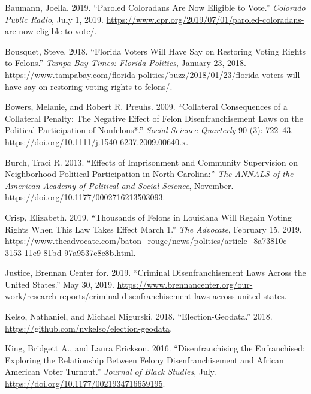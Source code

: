 \documentclass[
  12pt,
]{article}
\newlength{\cslhangindent}
\newenvironment{cslreferences}%
  {\setlength{\parindent}{0pt}%
  \everypar{\setlength{\hangindent}{\cslhangindent}}\ignorespaces}%
  {\par}
\begin{document}
\hypertarget{refs}{}
\begin{cslreferences}
\leavevmode\hypertarget{ref-Baumann2019}{}%
Baumann, Joella. 2019. ``Paroled Coloradans Are Now Eligible to Vote.'' \emph{Colorado Public Radio}, July 1, 2019. \url{https://www.cpr.org/2019/07/01/paroled-coloradans-are-now-eligible-to-vote/}.

\leavevmode\hypertarget{ref-Bousquet2018}{}%
Bousquet, Steve. 2018. ``Florida Voters Will Have Say on Restoring Voting Rights to Felons.'' \emph{Tampa Bay Times: Florida Politics}, January 23, 2018. \url{https://www.tampabay.com/florida-politics/buzz/2018/01/23/florida-voters-will-have-say-on-restoring-voting-rights-to-felons/}.

\leavevmode\hypertarget{ref-Bowers2009}{}%
Bowers, Melanie, and Robert R. Preuhs. 2009. ``Collateral Consequences of a Collateral Penalty: The Negative Effect of Felon Disenfranchisement Laws on the Political Participation of Nonfelons*.'' \emph{Social Science Quarterly} 90 (3): 722--43. \url{https://doi.org/10.1111/j.1540-6237.2009.00640.x}.

\leavevmode\hypertarget{ref-Burch2013}{}%
Burch, Traci R. 2013. ``Effects of Imprisonment and Community Supervision on Neighborhood Political Participation in North Carolina:'' \emph{The ANNALS of the American Academy of Political and Social Science}, November. \url{https://doi.org/10.1177/0002716213503093}.

\leavevmode\hypertarget{ref-Crisp2019}{}%
Crisp, Elizabeth. 2019. ``Thousands of Felons in Louisiana Will Regain Voting Rights When This Law Takes Effect March 1.'' \emph{The Advocate}, February 15, 2019. \url{https://www.theadvocate.com/baton_rouge/news/politics/article_8a73810c-3153-11e9-81bd-97a9537e8c8b.html}.

\leavevmode\hypertarget{ref-bcj_laws}{}%
Justice, Brennan Center for. 2019. ``Criminal Disenfranchisement Laws Across the United States.'' May 30, 2019. \url{https://www.brennancenter.org/our-work/research-reports/criminal-disenfranchisement-laws-across-united-states}.

\leavevmode\hypertarget{ref-Kelso2018}{}%
Kelso, Nathaniel, and Michael Migurski. 2018. ``Election-Geodata.'' 2018. \url{https://github.com/nvkelso/election-geodata}.

\leavevmode\hypertarget{ref-King2016}{}%
King, Bridgett A., and Laura Erickson. 2016. ``Disenfranchising the Enfranchised: Exploring the Relationship Between Felony Disenfranchisement and African American Voter Turnout.'' \emph{Journal of Black Studies}, July. \url{https://doi.org/10.1177/0021934716659195}.


\end{cslreferences}
\end{document}
